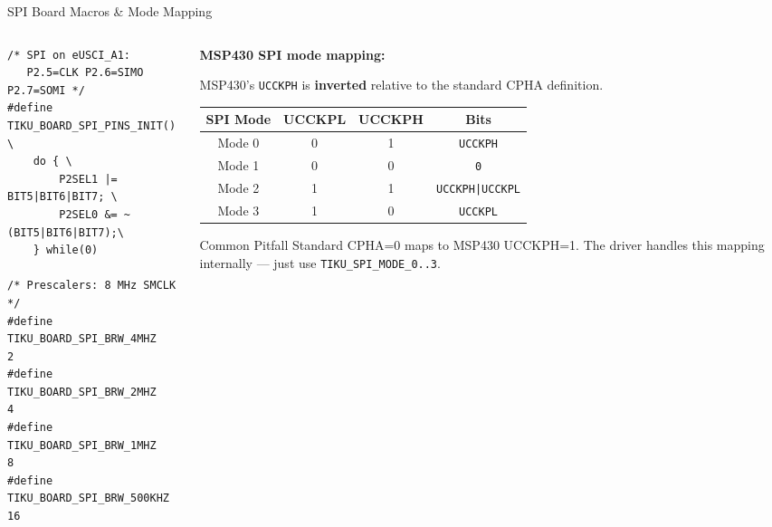 \documentclass[aspectratio=169, 10pt]{beamer}
\begin{document}
\begin{frame}[fragile]{SPI Board Macros \& Mode Mapping}
\begin{columns}[T]
\begin{column}{0.48\textwidth}
\begin{lstlisting}[style=cstyle,
  title={boards/tiku\_board\_fr5969\_launchpad.h}]
/* SPI on eUSCI_A1:
   P2.5=CLK P2.6=SIMO P2.7=SOMI */
#define TIKU_BOARD_SPI_PINS_INIT() \
    do { \
        P2SEL1 |= BIT5|BIT6|BIT7; \
        P2SEL0 &= ~(BIT5|BIT6|BIT7);\
    } while(0)

/* Prescalers: 8 MHz SMCLK */
#define TIKU_BOARD_SPI_BRW_4MHZ   2
#define TIKU_BOARD_SPI_BRW_2MHZ   4
#define TIKU_BOARD_SPI_BRW_1MHZ   8
#define TIKU_BOARD_SPI_BRW_500KHZ 16
\end{lstlisting}
\end{column}

\begin{column}{0.48\textwidth}
\textbf{MSP430 SPI mode mapping:}

\vspace{0.3em}
MSP430's \texttt{UCCKPH} is \textbf{inverted} relative to
the standard CPHA definition.

\vspace{0.3em}
\begin{table}
\centering
\scriptsize
\begin{tabular}{@{}cccc@{}}
\toprule
\textbf{SPI Mode} & \textbf{UCCKPL} & \textbf{UCCKPH} & \textbf{Bits} \\
\midrule
Mode 0 & 0 & 1 & \texttt{UCCKPH} \\
Mode 1 & 0 & 0 & \texttt{0} \\
Mode 2 & 1 & 1 & \texttt{UCCKPH|UCCKPL} \\
Mode 3 & 1 & 0 & \texttt{UCCKPL} \\
\bottomrule
\end{tabular}
\end{table}

\vspace{0.3em}
\begin{alertblock}{Common Pitfall}
Standard CPHA=0 maps to MSP430 UCCKPH=1.
The driver handles this mapping internally ---
just use \texttt{TIKU\_SPI\_MODE\_0..3}.
\end{alertblock}
\end{column}
\end{columns}
\end{frame}
\end{document}
